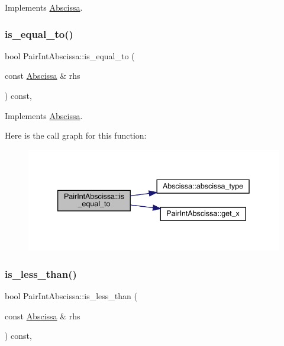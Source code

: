 Implements \mbox{\hyperlink{classAbscissa_a4adf4055c1eee010f9493e0ebb66348a}{Abscissa}}.

\mbox{\label{classPairIntAbscissa_a9f4bf45aafd0efa0a47fa6e8b77e25fa}} 
\subsubsection{\texorpdfstring{is\_equal\_to()}{is\_equal\_to()}\hspace{0.1cm}{\footnotesize\ttfamily [2/2]}}
{\footnotesize\ttfamily bool Pair\+Int\+Abscissa\+::is\+\_\+equal\+\_\+to (\begin{DoxyParamCaption}\item[{const \mbox{\hyperlink{classAbscissa}{Abscissa}} \&}]{rhs }\end{DoxyParamCaption}) const\hspace{0.3cm}{\ttfamily [inline]}, {\ttfamily [virtual]}}



Implements \mbox{\hyperlink{classAbscissa_a4adf4055c1eee010f9493e0ebb66348a}{Abscissa}}.

Here is the call graph for this function\+:
\nopagebreak
\begin{figure}[H]
\begin{center}
\leavevmode
\includegraphics[width=339pt]{dc/d86/classPairIntAbscissa_a9f4bf45aafd0efa0a47fa6e8b77e25fa_cgraph}
\end{center}
\end{figure}
\mbox{\label{classPairIntAbscissa_ab14bfd8eb2b117045417496b68a77c30}} 
\subsubsection{\texorpdfstring{is\_less\_than()}{is\_less\_than()}\hspace{0.1cm}{\footnotesize\ttfamily [1/2]}}
{\footnotesize\ttfamily bool Pair\+Int\+Abscissa\+::is\+\_\+less\+\_\+than (\begin{DoxyParamCaption}\item[{const \mbox{\hyperlink{classAbscissa}{Abscissa}} \&}]{rhs }\end{DoxyParamCaption}) const\hspace{0.3cm}{\ttfamily [inline]}, {\ttfamily [virtual]}}




